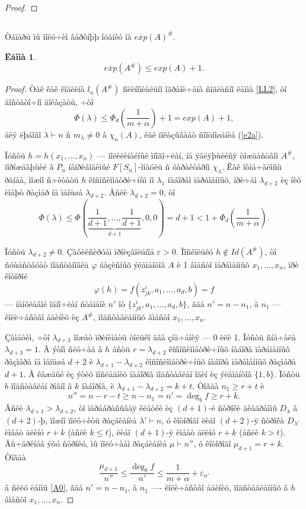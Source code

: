 \documentclass{article}
\numberwithin{equation}{section}
\theoremstyle{plain}
\newtheorem{lemma}{Ëåììà}[section]
\theoremstyle{definition}
\newtheorem{proof}{Äîêàçàòåëüñòâî}
\begin{document}
\begin{fulltext}
\begin{proof}
\end{proof}

\subsection{}\label{s4.2}
Òåïåðü ìû ïîëó÷èì âåðõíþþ îöåíêó íà $\overline{exp}(A)^\#$.

\begin{lemma}\label{LL4}
$$
\overline{exp}(A^\#) \le exp(A)+1.
$$
\end{lemma}
 \begin{proof}

Òàê êàê êîäëèíà $l_n(A^\#)$ ïîëèíîìèàëüíî îãðàíè÷åíà ñîãëàñíî ëåììå \ref{LL2}, òî
äîñòàòî÷íî äîêàçàòü, ÷òî
$$
\Phi(\lambda) \le \Phi_d(\frac{1}{m+\alpha})+1=exp(A)+1,
$$
äëÿ ëþáîãî $\lambda\vdash n$ ñ $m_\lambda\ne 0$ â $\chi_n(A)$, êàê ïîêàçûâàåò ñîîòíîøåíèå
(\ref{e2a}).

Ïóñòü $h=h(x_1,\ldots,x_n)$ --- ïîëèëèíåéíûé ìíîãî÷ëåí, íå ÿâëÿþùèéñÿ òîæäåñòâîì $A^\#$,
ïîðîæäàþùèé â $P_n$ íåïðèâîäèìûé $F[S_n]$-ìîäóëü ñ õàðàêòåðîì $\chi_\lambda$. Êàê îòìå÷àëîñü
ðàíåå, ìîæíî ñ÷èòàòü $h$ êîñîñèììåòðè÷íûì ïî $\lambda_1$ íàáîðàì ïåðåìåííûõ, ïðè÷åì
$\lambda_{d+2}$ èç íèõ èìåþò ðàçìåð íå ìåíüøå $\lambda_{d+2}$. Åñëè $\lambda_{d+2}=0$, òî
$$
\Phi(\lambda)\le \Phi(\underbrace{\frac{1}{d+1},\ldots,\frac{1}{d+1}}_{d+1},0,0)
= d+1 <1+\Phi_d(\frac{1}{m+\alpha}).
$$

Ïóñòü $\lambda_{d+2}\ne 0$. Çàôèêñèðóåì ïðîèçâîëüíîå $\varepsilon >0$. Ïîñêîëüêó
$h\not\in Id(A^\#)$, òî ñóùåñòâóåò ïîäñòàíîâêà $\varphi$ áàçèñíûõ ýëåìåíòîâ $A$ è 1 âìåñòî
ïåðåìåííûõ $x_1,\ldots,x_n$, ïðè êîòîðîé
$$
\varphi(h)=f(z^i_{jk},a_1,\ldots, a_d,b)=f
$$
--- íåíóëåâîé îäíî÷ëåí ñòåïåíè $n'$ îò $\{z^i_{jk},a_1,\ldots, a_d,b \} $, ãäå $n'=n-n_1$, à
$n_1$ --- êîëè÷åñòâî åäèíèö èç $A^\#$, ïîäñòàâëåííûõ âìåñòî $x_1,\ldots,x_n$. 

Çàìåòèì, ÷òî $\lambda_{d+3}$ ìîæåò ïðèíèìàòü òîëüêî äâà çíà÷åíèÿ --- $0$ èëè $1$. Ïóñòü
ñíà÷àëà $\lambda_{d+3}=1$. Â ýòîì ñëó÷àå â $h$ åñòü $r=\lambda_{d+2}$ êîñîñèììåòðè÷íûõ
íàáîðà ïåðåìåííûõ ðàçìåðà íå ìåíüøå $d+2$ è $\lambda_{d+1}-\lambda_{d+2}$ êîñîñèììåòðè÷íûõ
íàáîðà ïåðåìåííûõ ðàçìåðà  $d+1$. Â êàæäûé èç ýòèõ ïîñëåäíèõ íàáîðîâ ïîäñòàâëåí îäèí
èç ýëåìåíòîâ $\{1,b\}$. Ïóñòü $b$ ïîäñòàâëåí ðîâíî â $k$ íàáîðîâ, è
$\lambda_{d+1}-\lambda_{d+2}=k+t$. Òîãäà $n_1\ge r+t$ è
$$
n''=n-r-t\ge n-n_1=n'=\deg_b f \ge r+k.
$$
Åñëè $\lambda_{d+1}>\lambda_{d+2}$, òî ïåðåáðàñûâàÿ êëåòêè èç $(d+1)$-é ñòðîêè äèàãðàììû
$D_\lambda$ â $(d+2)$-þ, ìîæíî ïîëó÷èòü ðàçáèåíèå $\lambda'\vdash n$, ó êîòîðîãî ëèáî
$(d+2)$-ÿ ñòðîêà $D_{\lambda'}$ èìååò äëèíó $r+k$ (åñëè $k\le t$), ëèáî $(d+1)$-ÿ èìååò
äëèíó $r+k$ (åñëè $k> t$). Âû÷åðêíóâ ýòó ñòðîêó, ìû ïîëó÷àåì ðàçáèåíèå $\mu\vdash n''$,
ó êîòîðîãî $\mu_{d+1}=r+k$. Òîãäà
\begin{equation}\label{n5}
\frac{\mu_{d+1}}{n''} 
\le \frac{\deg_b f}{n'} \le \frac{1}{m+\alpha}+\varepsilon_{n'}
\end{equation}
â ñèëó ëåììû \ref{A0}, ãäå $n'=n-n_1$, à $n_1$ ---- êîëè÷åñòâî åäèíèö, ïîäñòàâëåííûõ â
$h$ âìåñòî $x_1,\ldots, x_n$.


\end{proof}
\end{fulltext}
\end{document}

